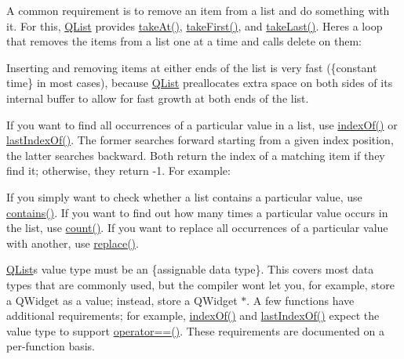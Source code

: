 A common requirement is to remove an item from a list and do something with it. For this, \hyperlink{class_q_list}{Q\+List} provides \hyperlink{class_q_list_a078f9ab0404fcfb8fcc0ee1b7c6699c4}{take\+At()}, \hyperlink{class_q_list_a8059621f8145f7b79278f619c1bb0e47}{take\+First()}, and \hyperlink{class_q_list_a410757ac0ab9febcda1541fa43adb98c}{take\+Last()}. Here\textquotesingle{}s a loop that removes the items from a list one at a time and calls {\ttfamily delete} on them\+:


\begin{DoxyCodeInclude}
\end{DoxyCodeInclude}
 Inserting and removing items at either ends of the list is very fast (\{constant time\} in most cases), because \hyperlink{class_q_list}{Q\+List} preallocates extra space on both sides of its internal buffer to allow for fast growth at both ends of the list.

If you want to find all occurrences of a particular value in a list, use \hyperlink{class_q_list_a1fa87bbf834812e0f400d8c14ab35b8a}{index\+Of()} or \hyperlink{class_q_list_aa0b792f98f9cf740bb6a8774572eac18}{last\+Index\+Of()}. The former searches forward starting from a given index position, the latter searches backward. Both return the index of a matching item if they find it; otherwise, they return -\/1. For example\+:


\begin{DoxyCodeInclude}
\end{DoxyCodeInclude}
 If you simply want to check whether a list contains a particular value, use \hyperlink{class_q_list_aedb4de9a920c63b531d2064bf0bee652}{contains()}. If you want to find out how many times a particular value occurs in the list, use \hyperlink{class_q_list_a0d021cc6668a845a26097dc9d36e8c2f}{count()}. If you want to replace all occurrences of a particular value with another, use \hyperlink{class_q_list_ab39c49b508cf66371cc536c2bc3fb544}{replace()}.

\hyperlink{class_q_list}{Q\+List}\textquotesingle{}s value type must be an \{assignable data type\}. This covers most data types that are commonly used, but the compiler won\textquotesingle{}t let you, for example, store a Q\+Widget as a value; instead, store a Q\+Widget $\ast$. A few functions have additional requirements; for example, \hyperlink{class_q_list_a1fa87bbf834812e0f400d8c14ab35b8a}{index\+Of()} and \hyperlink{class_q_list_aa0b792f98f9cf740bb6a8774572eac18}{last\+Index\+Of()} expect the value type to support {\ttfamily \hyperlink{class_q_list_a5de7da6896f7bd2a446dbdaab6466c0f}{operator==()}}. These requirements are documented on a per-\/function basis.


